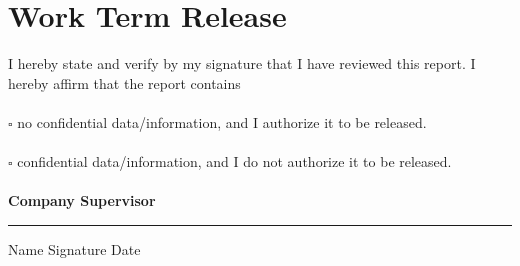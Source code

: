 
\section*{Work Term Release}


\vspace{1.4cm}
\large \noindent
I hereby state and verify by my signature that I have reviewed this report. I hereby affirm that the report contains \\
\vspace{0.6cm} \\
$\square$ no confidential data/information, and I authorize it to be released. \\
\vspace{0.3cm} \\
$\square$ confidential data/information, and I do not authorize it to be released. \\
\vspace{1.6cm}\\
\textbf{\large{Company Supervisor}}
\normalsize
\vspace{2cm}
\hrule
\vspace{0.2cm}
\noindent Name \hspace{7cm} Signature \hspace{3cm} Date
